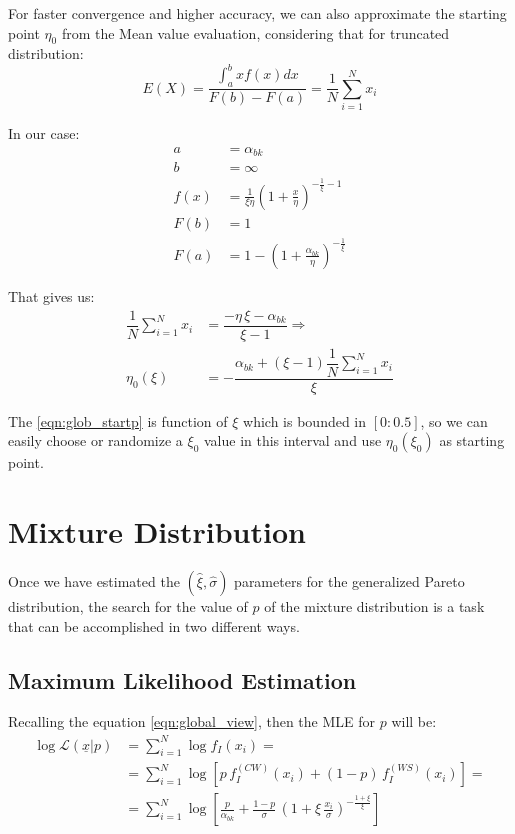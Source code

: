 For faster convergence and higher accuracy, we can also approximate the starting point $\eta_0$ from the Mean value evaluation, considering that for truncated distribution:
\begin{equation}
	E(X) = \frac{\int_{a}^{b} x f(x) dx}{F(b) - F(a)} = \dfrac{1}{N} \sum_{i = 1}^N x_i
\end{equation}
 
In our case:
\begin{subequations}
\begin{align}
	a &= \alpha_{bk} \\
	b &= \infty \\
	f(x) &= \frac{1}{\xi \eta} \left(1 + \frac{x}{\eta} \right)^{-\frac{1}{\xi} - 1} \\
	F(b) &= 1 \\
	F(a) &= 1 - \left(1 + \frac{\alpha_{bk}}{\eta} \right)^{-\frac{1}{\xi}}
\end{align}
\end{subequations}

That gives us:
\begin{align}
	\dfrac{1}{N} \sum_{i = 1}^N x_i &= \dfrac{-\eta \, \xi - \alpha_{bk}}{\xi - 1} \Rightarrow \nonumber \\
	\eta_0(\xi) &= -\dfrac{\alpha_{bk} + (\xi - 1) \dfrac{1}{N} \displaystyle\sum_{i = 1}^N x_i}{\xi} \label{eqn:glob_startp}
\end{align}

The \eqref{eqn:glob_startp} is function of $\xi$ which is bounded in $[0:0.5]$, so we can easily choose or randomize a $\xi_0$ value in this interval and use $\eta_0(\xi_0)$ as starting point.

\section{Mixture Distribution} \label{sec:mixture_estim}

Once we have estimated the $(\hat{\xi}, \hat{\sigma})$ parameters for the generalized Pareto distribution, the search for the value of $p$ of the mixture distribution is a task that can be accomplished in two different ways.

\subsection{Maximum Likelihood Estimation} \label{sec:global_mix_mle}

Recalling the equation \eqref{eqn:global_view}, then the \ac{MLE} for $p$ will be:
\begin{align}
	\log \mathcal{L}(\underline{x}| p ) &= \sum_{i = 1}^N \log f_I(x_i) = \nonumber \\
		&= \sum_{i = 1}^N \log \left[ p \, f_I^{(CW)}(x_i) + (1 - p) \, f_I^{(WS)}(x_i) \right] = \nonumber \\
		&= \sum_{i = 1}^N \log \left[
		  \frac{p}{\alpha_{bk}} + \frac{1 - p}{\sigma} \, \left( 1 + \xi \, \frac{x_i}{\sigma} \right)^{- \frac{ 1 + \xi}{\xi}}
		\right]
\end{align}

